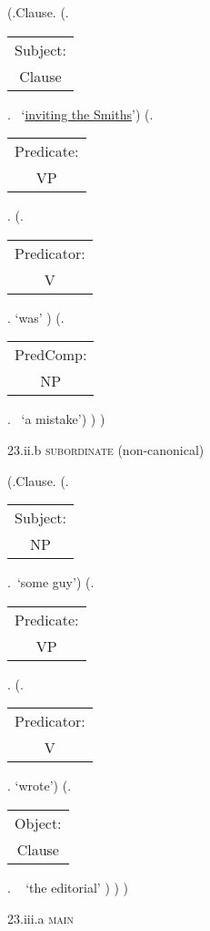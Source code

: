 \documentclass[12pt,letterpaper]{article}
\begin{document}
\begin{figure}
	\begin{center}
		\begin{parsetree}
			(.Clause.
			(.\begin{tabular}{c}Subject:\\Clause\end{tabular}.~ `\underline{inviting the Smiths}')
			(.\begin{tabular}{c}Predicate:\\VP\end{tabular}.
			(.\begin{tabular}{c}Predicator:\\V\end{tabular}. `was' )
			(.\begin{tabular}{c}PredComp:\\NP\end{tabular}.~ `a mistake')
			)
			)
			
			\hfill \break\hfill \break
		\end{parsetree}
		23.ii.b \textsc{subordinate} (non-canonical)
	\end{center}
\end{figure}

\begin{figure}
	\begin{center}
		\begin{parsetree}
			(.Clause.
			(.\begin{tabular}{c}Subject:\\NP\end{tabular}.~`some guy')
			(.\begin{tabular}{c}Predicate:\\VP\end{tabular}.
			(.\begin{tabular}{c}Predicator:\\V\end{tabular}. `wrote')
			(.\begin{tabular}{c}Object:\\Clause\end{tabular}. ~  `the editorial' )
			)
			)
			
			\hfill \break\hfill \break
		\end{parsetree}
		23.iii.a \textsc{main}
	\end{center}
\end{figure}
\end{document}
